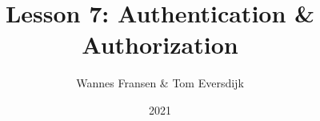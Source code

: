 \documentclass{beamer}
\title{Lesson 7: Authentication \& Authorization}
\author{Wannes Fransen \& Tom Eversdijk}
\institute{UC Leuven}
\date{2021}
\begin{document}
\frame{\titlepage}





% 
\end{document}
